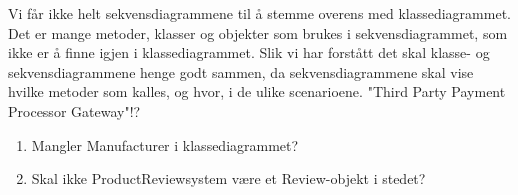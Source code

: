 
Vi får ikke helt sekvensdiagrammene til å stemme overens med klassediagrammet. Det er mange metoder, klasser og objekter som brukes i sekvensdiagrammet, som ikke er å finne igjen i klassediagrammet. Slik vi har forstått det skal klasse- og sekvensdiagrammene henge godt sammen, da sekvensdiagrammene skal vise hvilke metoder som kalles, og hvor, i de ulike scenarioene. "Third Party Payment Processor Gateway"!?

\begin{enumerate}

\item{
Mangler Manufacturer i klassediagrammet?
}

\item{
Skal ikke ProductReviewsystem være et Review-objekt i stedet?
}

\end{enumerate}